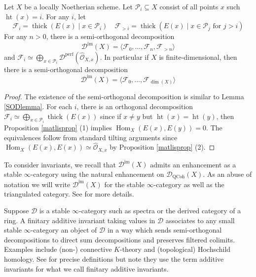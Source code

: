 \documentclass[12pt,oneside]{amsart}
\DeclareMathOperator{\Hom}{Hom}
\DeclareMathOperator{\thick}{thick}
\DeclareMathOperator{\QCoh}{QCoh}
\DeclareMathOperator{\perf}{perf}
\DeclareMathOperator{\immac}{im}
\DeclareMathOperator{\hgt}{ht}
\begin{document}
\begin{theorem} \label{SODfiltration}
Let $X$ be a locally Noetherian scheme. Let $\mathcal{P}_{i} \subseteq X$ consist of all points $x$ such $\hgt(x) = i$. For any $i$, let
\[
\mathcal{F}_i = \thick(E(x) \mid x \in \mathcal{P}_i) \quad \mathcal{F}_{>i} = \thick(E(x) \mid x \in \mathcal{P}_{j} \text{ for } {j >i})
\]
For any $n>0$, there is a semi-orthogonal decomposition
\[
\mathcal{D}^{\immac}(X) = \langle \mathcal{F}_0,\dots ,\mathcal{F}_n,\mathcal{F}_{>n} \rangle
\] 
and $\mathcal{F}_i \simeq \bigoplus_{x \in \mathcal{P}_i} \mathcal{D}^{\perf}(\widehat{\mathcal{O}}_{X,x})$. In particular if $X$ is finite-dimensional, then there is a semi-orthogonal decomposition
\[
\mathcal{D}^{\immac}(X) = \langle \mathcal{F}_0,\dots ,\mathcal{F}_{\dim(X)} \rangle
\] 
\end{theorem}


\begin{proof}
The existence of the semi-orthogonal decomposition is similar to Lemma \ref{SODlemma}. For each $i$, there is an orthogonal decomposition
$\mathcal{F}_i \simeq \bigoplus_{x \in \mathcal{P}_i} \thick(E(x))$ since if $x \neq y$ but $\hgt(x) = \hgt(y)$, then Proposition \ref{matlisprop} (1) implies $\Hom_X(E(x),E(y)) = 0$. The equivalences follow from standard tilting arguments since $\Hom_X(E(x),E(x)) \simeq \widehat{\mathcal{O}}_{X,x}$ by Proposition \ref{matlisprop} (2). 
\end{proof}

\begin{remark}
To consider invariants, we recall that $\mathcal{D}^{\immac}(X)$ admits an enhancement as a stable $\infty$-category using the natural enhancement on $\mathcal{D}_{\QCoh}(X)$. As an abuse of notation we will write $\mathcal{D}^{\immac}(X)$ for the stable $\infty$-category as well as the triangulated category. See \cite{Lur09} for more details. 
\end{remark}

\begin{remark}
Suppose $\mathcal{D}$ is a stable $\infty$-category such as spectra or the derived category of a ring. A finitary additive invariant taking values in $\mathcal{D}$ associates to any small stable $\infty$-category an object of $\mathcal{D}$ in a way which sends semi-orthogonal decompositions to direct sum decompositions and preserves filtered colimits. Examples include (non-) connective $K$-theory and (topological) Hochschild homology. See \cite{BGT13} for precise definitions but note they use the term additive invariants for what we call finitary additive invariants.
\end{remark}
\end{document}
